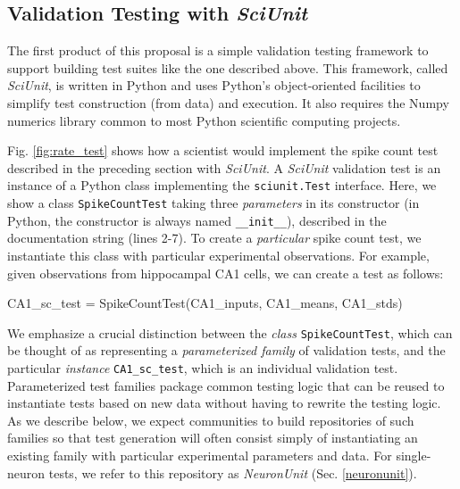 \documentclass[11pt,letterpaper]{article}
\let\verbx\lstinline
\begin{document}
\subsection{Validation Testing with \emph{SciUnit}} 
The first product of this proposal is a simple validation testing framework to support building test suites like the one described above. This framework, called \emph{SciUnit}, is written in Python and uses Python's object-oriented facilities to simplify test construction (from data) and execution\cite{python_oo_url}.  It also requires the Numpy numerics library common to most Python scientific computing projects\cite{numpy_url}.

Fig. \ref{fig:rate_test} shows how a scientist would implement the spike count test described in the preceding section with \textit{SciUnit}. A \textit{SciUnit} validation test is an {instance} of a Python class implementing the \verbx{sciunit.Test} interface. Here, we show a class \verbx{SpikeCountTest} taking three \emph{parameters} in its constructor (in Python, the constructor is always named \verbx{__init__}), described in the documentation string (lines 2-7). To create a \emph{particular} spike count test, we instantiate this class with particular experimental observations. For example, given observations from hippocampal CA1 cells, we can create a test as follows:
\begin{python}
  CA1_sc_test = SpikeCountTest(CA1_inputs, CA1_means, CA1_stds)
\end{python}

We emphasize a crucial distinction between the \textit{class} \verbx{SpikeCountTest}, which can be thought of as representing a \emph{parameterized family} of validation tests, and the particular \textit{instance} \verbx{CA1_sc_test}, which is an individual validation test. Parameterized test families package common testing logic that can be reused to instantiate tests based on new data without having to rewrite the testing logic. As we describe below, we expect communities to build repositories of such families so that test generation will often consist simply of instantiating an existing family with particular experimental parameters and data. For single-neuron tests, we refer to this repository as \textit{NeuronUnit} (Sec. \ref{neuronunit}). 
\end{document}
